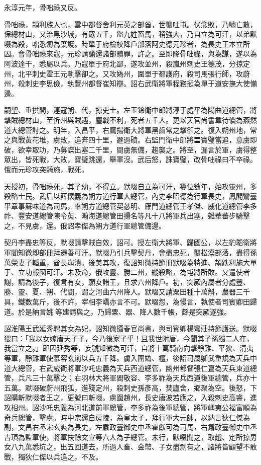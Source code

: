 \begin{pinyinscope}
 永淳元年，骨咄祿又反。



 骨咄祿，頡利族人也，雲中都督舍利元英之部酋，世襲吐屯。伏念敗，乃嘯亡散，保總材山，又治黑沙城，有眾五千，盜九姓畜馬，稍強大，乃自立為可汗，以弟默啜為殺，咄悉匐為葉護。時單于府檢校降戶部落阿史德元珍者，為長史王本立所囚。會骨咄祿來寇，元珍請諭還諸部贖罪，許之。至即降骨咄祿，與為謀，遂以為阿波達干，悉屬以兵。乃寇單于府北鄙，遂攻並州，殺嵐州刺史王德茂，分掠定州，北平刺史霍王元軌擊卻之。又攻媯州，圍單于都護府，殺司馬張行師，攻蔚州，殺刺史李思儉，執豐州都督崔知辯。詔右武衛將軍程務挺為單于道安撫大使備邊。



 嗣聖、垂拱間，連寇朔、代，掠吏士。左玉鈴衛中郎將淳于處平為陽曲道總管，將擊賊總材山，至忻州與賊遇，鏖戰不利，死者五千人。更以天官尚書韋待價為燕然道大總管討之。明年，入昌平，右鷹揚衛大將軍黑齒常之擊卻之。復入朔州地，常之與戰黃花堆，虜敗，追奔四十里，遯過磧。右監門衛中郎將〓寶璧當追，意虜即破，欲幸取功，乃募諜出塞二千里，間虜無備，趨襲之。將至，漏言於軍，虜得整眾出，皆死戰，大敗，寶璧跳還，舉軍沒。武后怒，誅寶璧，改骨咄祿曰不卒祿。俄而元珍攻突騎施，戰死。



 天授初，骨咄祿死，其子幼，不得立。默啜自立為可汗，篡位數年，始攻靈州，多殺略士民。武后以薛懷義為朔方道行軍大總管，內史李昭德為行軍長史，鳳閣鸞臺平章事蘇味道為司馬，率朔方道總管契苾明、雁門道總管王孝傑、威化道總管李多祚、豐安道總管陳令英、瀚海道總管田揚名等凡十八將軍兵出塞，雜華蕃步騎擊之，不見虜，還。俄詔孝傑為朔方道行軍總管備邊。



 契丹李盡忠等反，默啜請擊賊自效，詔可。授左衛大將軍、歸國公，以左豹韜衛將軍閻知微即部冊拜遷善可汗。默啜乃引兵擊契丹，會盡忠死，襲松漠部落，盡得孫萬榮妻子輜重，酋長崩潰。後美其攻，復詔知微持節冊默啜為特進、頡跌利施大單于、立功報國可汗。未及命，俄攻靈、勝二州，縱殺略，為屯將所敗。又遣使者謝，請為後子，復言有女，願女諸王，且求六州降戶。初，突厥內屬者分處豐、勝、靈、夏、朔、代間，謂之河曲六州降人。默啜又請粟田種十萬斛，農器三千具，鐵數萬斤，後不許，宰相李嶠亦言不可。默啜怨，為慢言，執使者司賓卿田歸道。於是納言姚等建請與之，乃歸粟、器、降人數千帳，繇是突厥遂強。



 詔淮陽王武延秀聘其女為妃，詔知微攝春官尚書，與司賓卿楊鸞莊持節護送。默啜猥曰：「我以女嫁唐天子子，今乃後家子乎！且我世附唐，今聞其子孫獨二人在，我當立之。」即囚延秀等，妄號知微為可汗，自將十萬騎南向擊靜難、平狄、清夷等軍，靜難軍使慕容玄崱以兵五千降。虜入圍媯、檀，後詔司屬卿武重規為天兵中道大總管，右武威衛將軍沙吒忠義為天兵西道總管，幽州都督張仁亶為天兵東道總管，兵凡三十萬擊之；右羽林大將軍閻敬容、李多祚為天兵西道後軍總管，兵亦十五萬。默啜破蔚州飛狐，進殘定州，殺刺史孫彥高，焚廬舍，鄉聚為空。後怒，下詔購斬默啜者王之，更號曰斬啜。虜圍趙州，長史唐波若應之，入殺刺史高睿，進攻相州。詔沙吒忠義為河北道前軍總管，李多祚為後軍總管，將軍嵎夷公福富順為奇兵總管，擊虜。時中宗還自房陵，為皇太子，拜行軍大元帥，以納言狄仁傑為副，文昌右丞宋玄爽為長史，左肅政臺御史中丞霍獻可為司馬，右肅政臺御史中丞吉頊為監軍使，將軍扶餘文宣等六人為子總管。未行，默啜聞之，取趙、定所掠男女八九萬悉坑之，出五回道去，所過人畜、金幣、子女盡剽有之，諸將皆顧望不敢戰，獨狄仁傑以兵追之，不及。




\end{pinyinscope}
